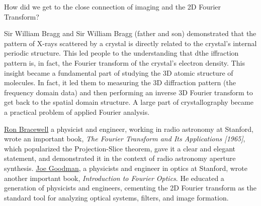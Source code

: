 \documentclass[
  letterpaper,
]{book}
\begin{document}
\begin{tcolorbox}[enhanced jigsaw, opacityback=0, breakable, coltitle=black, leftrule=.75mm, left=2mm, colframe=quarto-callout-note-color-frame, opacitybacktitle=0.6, bottomtitle=1mm, bottomrule=.15mm, toprule=.15mm, title=\textcolor{quarto-callout-note-color}{\faInfo}\hspace{0.5em}{2D Fourier Transforms}, titlerule=0mm, toptitle=1mm, colback=white, rightrule=.15mm, colbacktitle=quarto-callout-note-color!10!white, arc=.35mm]

How did we get to the close connection of imaging and the 2D Fourier
Transform?

Sir William Bragg and Sir William Bragg (father and son) demonstrated
that the pattern of X-rays scattered by a crystal is directly related to
the crystal's internal periodic structure. This led people to the
understanding that dthe iffraction pattern is, in fact, the Fourier
transform of the crystal's electron density. This insight became a
fundamental part of studying the 3D atomic structure of molecules. In
fact, it led them to measuring the 3D diffraction pattern (the frequency
domain data) and then performing an inverse 3D Fourier transform to get
back to the spatial domain structure. A large part of crystallography
became a practical problem of applied Fourier analysis.

\href{https://trees.stanford.edu/bracewell.htm}{Ron Bracewell} a
physicist and engineer, working in radio astronomy at Stanford, wrote an
important book, \emph{The Fourier Transform and Its Applications
{[}1965{]}}, which popularized the Projection-Slice
theorem\footnotemark{}, gave it a clear and elegant statement, and
demonstrated it in the context of radio astronomy aperture synthesis.
\href{https://youtu.be/Aoj-JfaXcfw?si=t3dirvqJcwU6BYH5}{Joe Goodman}, a
physicists and engineer in optics at Stanford, wrote another important
book, \emph{Introduction to Fourier Optics}. He educated a generation of
physicists and engineers, cementing the 2D Fourier transform as the
standard tool for analyzing optical systems, filters, and image
formation.

\begin{figure}[H]

\end{figure}
\end{tcolorbox}
\end{document}

